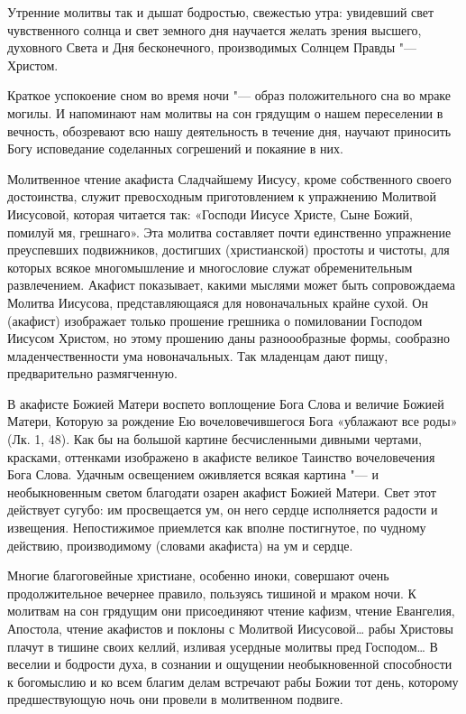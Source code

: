 {{{{Утренние молитвы так и дышат бодростью, свежестью утра: увидевший свет чувственного солнца и свет земного дня научается желать зрения высшего, духовного Света и Дня бесконечного, производимых Солнцем Правды "--- Христом.

Краткое успокоение сном во время ночи "--- образ положительного сна во мраке могилы. И напоминают нам молитвы на сон грядущим о нашем переселении в вечность, обозревают всю нашу деятельность в течение дня, научают приносить Богу исповедание соделанных согрешений и покаяние в них.

Молитвенное чтение акафиста Сладчайшему Иисусу, кроме собственного своего достоинства, служит превосходным приготовлением к упражнению Молитвой Иисусовой, которая читается так: «Господи Иисусе Христе, Сыне Божий, помилуй мя, грешнаго». Эта молитва составляет почти единственно упражнение преуспевших подвижников, достигших (христианской) простоты и чистоты, для которых всякое многомышление и многословие служат обременительным развлечением. Акафист показывает, какими мыслями может быть сопровождаема Молитва Иисусова, представляющаяся для новоначальных крайне сухой. Он (акафист) изображает только прошение грешника о помиловании Господом Иисусом Христом, но этому прошению даны разноообразные формы, сообразно младенчественности ума новоначальных. Так младенцам дают пищу, предварительно размягченную.

В акафисте Божией Матери воспето воплощение Бога Слова и величие Божией Матери, Которую за рождение Ею вочеловечившегося Бога «ублажают все роды» (Лк. 1, 48). Как бы на большой картине бесчисленными дивными чертами, красками, оттенками изображено в акафисте великое Таинство вочеловечения Бога Слова. Удачным освещением оживляется всякая картина "--- и необыкновенным светом благодати озарен акафист Божией Матери. Свет этот действует сугубо: им просвещается ум, он него сердце исполняется радости и извещения. Непостижимое приемлется как вполне постигнутое, по чудному действию, производимому (словами акафиста) на ум и сердце.

Многие благоговейные христиане, особенно иноки, совершают очень продолжительное вечернее правило, пользуясь тишиной и мраком ночи. К молитвам на сон грядущим они присоединяют чтение кафизм, чтение Евангелия, Апостола, чтение акафистов и поклоны с Молитвой Иисусовой… рабы Христовы плачут в тишине своих келлий, изливая усердные молитвы пред Господом… В веселии и бодрости духа, в сознании и ощущении необыкновенной способности к богомыслию и ко всем благим делам встречают рабы Божии тот день, которому предшествующую ночь они провели в молитвенном подвиге.

}}}}
